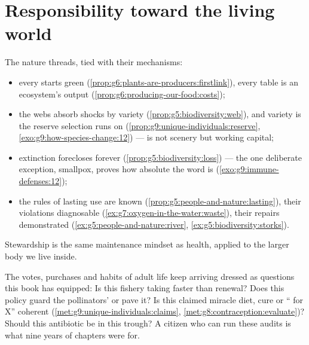 \section{Responsibility toward the living world}

\begin{proposition}\label{prop:g9:our-responsibility:stewardship}
The nature threads, tied with their mechanisms:
\begin{itemize}
  \item every  starts green
        (\cref{prop:g6:plants-are-producers:firstlink}),
        every table is an ecosystem's output
        (\cref{prop:g6:producing-our-food:costs});
  \item the webs absorb shocks by variety
        (\cref{prop:g5:biodiversity:web}), and variety is
        the reserve selection runs on
        (\cref{prop:g9:unique-individuals:reserve},
        \cref{exo:g9:how-species-change:12}) ---
         is not scenery but working capital;
  \item extinction forecloses forever
        (\cref{prop:g5:biodiversity:loss}) --- the one
        deliberate exception, smallpox, proves how
        absolute the word is
        (\cref{exo:g9:immune-defenses:12});
  \item the rules of lasting use are known
        (\cref{prop:g5:people-and-nature:lasting}), their
        violations diagnosable
        (\cref{ex:g7:oxygen-in-the-water:waste}), their
        repairs demonstrated
        (\cref{ex:g5:people-and-nature:river},
        \cref{ex:g5:biodiversity:storks}).
\end{itemize}
Stewardship is the same maintenance mindset as health,
applied to the larger body we live inside.
\end{proposition}
\admitted

\begin{example}\label{ex:g9:our-responsibility:citizen}
The votes, purchases and habits of adult life keep
arriving dressed as questions this book has equipped:
Is this fishery taking faster than renewal? Does this
policy guard the pollinators'  or pave it? Is
this claimed miracle diet, cure or `` for X''
coherent (\cref{met:g9:unique-individuals:claims},
\cref{met:g8:contraception:evaluate})? Should this
antibiotic be in this trough? A citizen who can run
these audits is what nine years of chapters were for.
\end{example}

